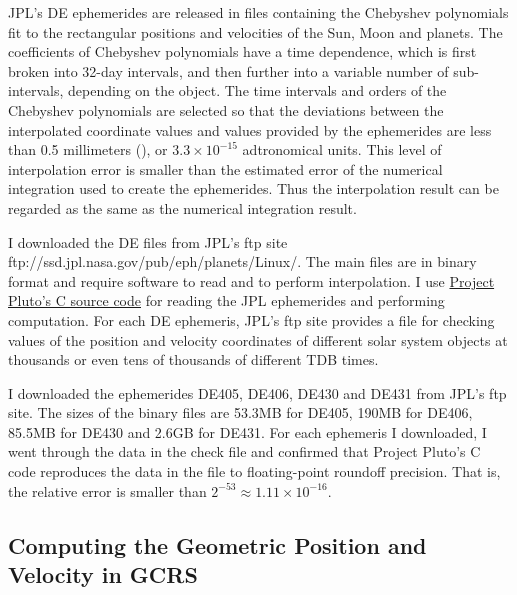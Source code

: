 \documentclass[12pt]{article}
\begin{document}
\begin{CJK}{UTF8}{bkai}
JPL's DE ephemerides are released in files containing the 
Chebyshev polynomials fit to the rectangular positions and velocities of the 
Sun, Moon and planets. 
The coefficients of Chebyshev polynomials have a time dependence, which is first broken into
32-day intervals, and then further into a variable number of
sub-intervals, depending on the object.
The time intervals and 
orders of the Chebyshev polynomials are 
selected so that the deviations between the interpolated coordinate values 
and values provided by the ephemerides are less than 0.5 
millimeters (\cite{newhall89}), or $3.3\times 10^{-15}$ adtronomical units. 
This level of interpolation error is smaller than the estimated error of the numerical 
integration used to create the ephemerides. Thus the interpolation result can be 
regarded as the same as the numerical integration result.

I downloaded the DE files from JPL's ftp site 
ftp://ssd.jpl.nasa.gov/pub/eph/planets/Linux/. 
The main files are in binary format and require software to read 
and to perform interpolation. I use \href{https://www.projectpluto.com/jpl_eph.htm}
{Project Pluto's C source code} for reading the JPL ephemerides and performing 
computation. For each DE ephemeris, JPL's ftp site provides a file for checking 
values of the position and velocity coordinates of different solar system 
objects at thousands or even tens of thousands of different TDB times. 

I downloaded the ephemerides DE405, DE406, DE430 and DE431 from 
JPL's ftp site. The sizes of the binary files 
are 53.3MB for DE405, 190MB for DE406, 85.5MB for DE430 and 2.6GB for DE431. 
For each ephemeris I downloaded,
I went through the data in the check file and confirmed that Project Pluto's 
C code reproduces the data in the file to floating-point roundoff precision. 
That is, the relative error is smaller than $2^{-53}\approx 1.11\times 10^{-16}$.

\subsection{Computing the Geometric Position and Velocity in GCRS}


\end{CJK}
\end{document}
